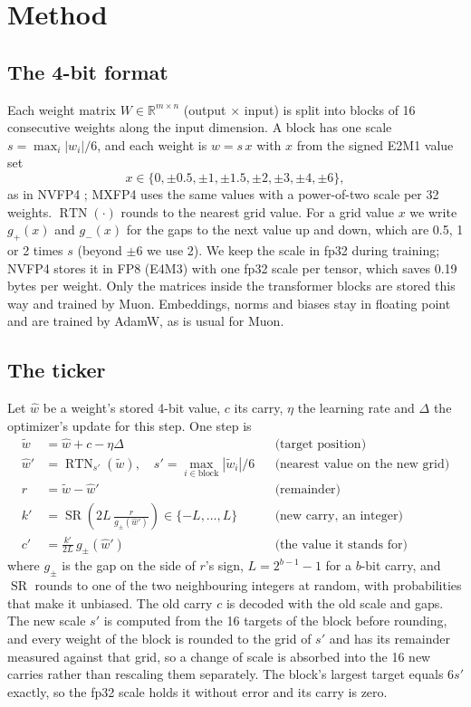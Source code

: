 \documentclass[11pt]{article}
\newcommand{\RTN}{\operatorname{RTN}}
\newcommand{\SR}{\operatorname{SR}}
\begin{document}
\section{Method}\label{sec:method}

\subsection{The 4-bit format}
Each weight matrix $W\in\mathbb{R}^{m\times n}$ (output $\times$ input) is split into blocks of 16 consecutive weights
along the input dimension. A block has one scale $s = \max_i |w_i| / 6$, and each weight is $w = s\,x$ with $x$ from
the signed E2M1 value set
\[
  x \in \{0, \pm 0.5, \pm 1, \pm 1.5, \pm 2, \pm 3, \pm 4, \pm 6\},
\]
as in NVFP4 \citep{nvidia2025nvfp4}; MXFP4 \citep{rouhani2023mx} uses the same values with a power-of-two scale per
32 weights. $\RTN(\cdot)$ rounds to the nearest grid value. For a grid value $x$ we write $g_+(x)$ and $g_-(x)$ for
the gaps to the next value up and down, which are 0.5, 1 or 2 times $s$ (beyond $\pm 6$ we use 2). We keep the scale
in fp32 during training; NVFP4 stores it in FP8 (E4M3) with one fp32 scale per tensor, which saves 0.19 bytes per
weight. Only the matrices inside the transformer blocks are stored this way and trained by Muon. Embeddings, norms and
biases stay in floating point and are trained by AdamW, as is usual for Muon.

\subsection{The ticker}
Let $\hat w$ be a weight's stored 4-bit value, $c$ its carry, $\eta$ the learning rate and $\Delta$ the optimizer's
update for this step. One step is
\begin{align}
  \tilde w &= \hat w + c - \eta \Delta && \text{(target position)} \label{eq:target}\\
  \hat w' &= \RTN_{s'}(\tilde w), \quad s' = \max_{i\in\text{block}} |\tilde w_i| / 6 && \text{(nearest value on the new grid)} \label{eq:round}\\
  r &= \tilde w - \hat w' && \text{(remainder)}\\
  k' &= \SR\!\left(2L \, \frac{r}{g_{\pm}(\hat w')}\right) \in \{-L,\dots,L\} && \text{(new carry, an integer)}\\
  c' &= \frac{k'}{2L}\, g_{\pm}(\hat w') && \text{(the value it stands for)}
\end{align}
where $g_\pm$ is the gap on the side of $r$'s sign, $L = 2^{b-1}-1$ for a $b$-bit carry, and $\SR$ rounds to one of
the two neighbouring integers at random, with probabilities that make it unbiased. The old carry $c$ is decoded with
the old scale and gaps. The new scale $s'$ is computed from the 16 targets of the block before rounding, and every
weight of the block is rounded to the grid of $s'$ and has its remainder measured against that grid, so a change of
scale is absorbed into the 16 new carries rather than rescaling them separately. The block's largest target equals
$6s'$ exactly, so the fp32 scale holds it without error and its carry is zero.
\end{document}
